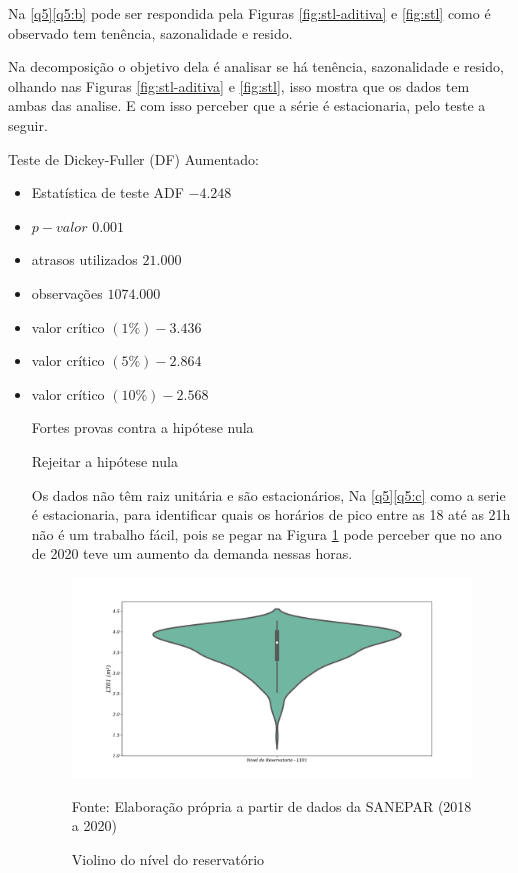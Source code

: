  Na  \ref{q5}\ref{q5:b} pode ser respondida pela Figuras \ref{fig:stl-aditiva} e \ref{fig:stl} como é observado tem tenência, sazonalidade e resido.
 
Na decomposição o objetivo dela é analisar se há tenência, sazonalidade e resido, olhando nas Figuras \ref{fig:stl-aditiva} e \ref{fig:stl}, isso mostra que os dados tem ambas das analise. E com isso perceber que a série é estacionaria, pelo teste a seguir.

Teste de Dickey-Fuller (DF) Aumentado: 
\begin{itemize}
	\item Estatística de teste ADF     $-4.248$
\item $p-valor$                       $0.001$
\item atrasos utilizados         $21.000$
\item  observações              $1074.000$
\item valor crítico $(1\%)           -3.436$
\item valor crítico $(5\%)           -2.864$
\item valor crítico $(10\%)          -2.568$


Fortes provas contra a hipótese nula

Rejeitar a hipótese nula

Os dados não têm raiz unitária e são estacionários, Na \ref{q5}\ref{q5:c} como a serie é estacionaria, para identificar quais os horários de pico entre as 18 até as 21h não é um trabalho fácil, pois se pegar na Figura \ref{fig:hist} pode perceber que no ano de 2020 teve um aumento da demanda nessas horas.

\begin{figure}[H]
	\centering
	\caption{Violino do nível do reservatório}
	\label{fig:hist}
	\includegraphics[width=1\linewidth]{Resultados/Figuras/viol}
	
	Fonte: Elaboração própria a partir de dados da SANEPAR (2018 a 2020)
\end{figure}


\end{itemize}
